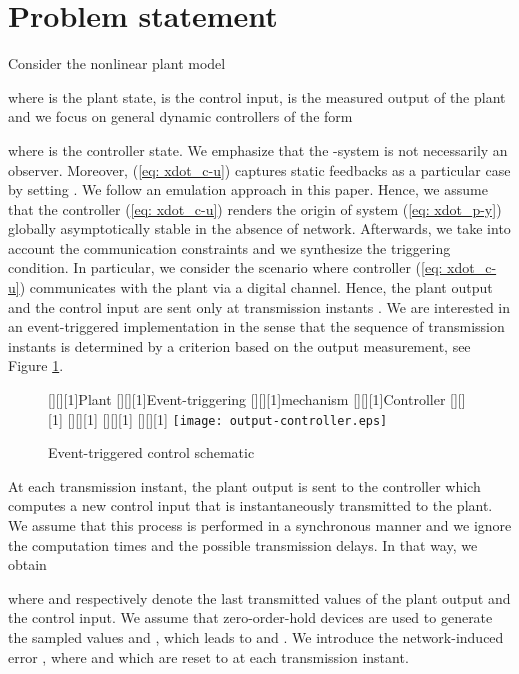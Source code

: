 \documentclass[a4paper, 9pt, twocolumn]{IEEEtran}
\theoremstyle{plain}
\theoremstyle{definition}
\begin{document}
\section{Problem statement} \label{sec: problem-statement}
Consider the nonlinear plant model

where  is the plant state,  is the control input,  is the measured output of the plant and we focus on general dynamic controllers of the form

where  is the controller state. We emphasize that the -system is not necessarily an observer. Moreover, (\ref{eq: xdot_c-u}) captures static feedbacks as a particular case by setting . We follow an emulation approach in this paper. Hence, we assume that the controller (\ref{eq: xdot_c-u}) renders the origin of system (\ref{eq: xdot_p-y}) globally asymptotically stable in the absence of network. Afterwards, we take into account the communication constraints and we synthesize the triggering condition. In particular, we consider the scenario where controller (\ref{eq: xdot_c-u}) communicates with the plant via a digital channel. Hence, the plant output and the control input are sent only at transmission instants . We are interested in an event-triggered implementation in the sense that the sequence of transmission instants is determined by a criterion based on the output measurement, see Figure \ref{fig:output-controller}.
\begin{figure}[h!]
\centering \scriptsize
{}[][][1]{Plant}
[][][1]{Event-triggering}
[][][1]{mechanism}
[][][1]{Controller}
[][][1]{}
[][][1]{}
[][][1]{}
[][][1]{}
\texttt{[image: output-controller.eps]}
\caption{Event-triggered control schematic \cite{Donkers2012output}}\label{fig:output-controller}
\end{figure}
At each transmission instant, the plant output is sent to the controller which computes a new control input that is instantaneously transmitted to the plant. We assume that this process is performed in a synchronous manner and we ignore the computation times and the possible transmission delays. In that way, we obtain

\noindent where  and  respectively denote the last transmitted values of the plant output and the control input. We assume that zero-order-hold devices are used to generate the sampled values  and , which leads to   and . We introduce the network-induced error , where  and  which are reset to  at each transmission instant.
\end{document}
